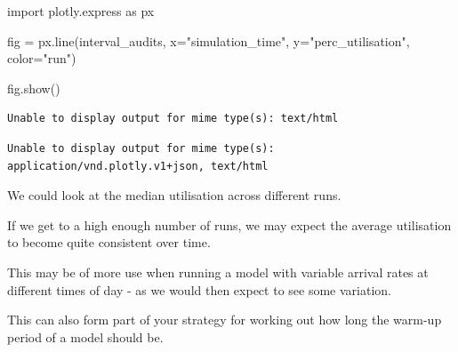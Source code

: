 \documentclass[
  letterpaper,
  DIV=11,
  numbers=noendperiod]{scrreprt}
\newenvironment{Shaded}{}{}
\newcommand{\ImportTok}[1]{\textcolor[rgb]{0.01,0.18,0.38}{#1}}
\newcommand{\NormalTok}[1]{\textcolor[rgb]{0.14,0.16,0.18}{#1}}
\newcommand{\OperatorTok}[1]{\textcolor[rgb]{0.14,0.16,0.18}{#1}}
\newcommand{\StringTok}[1]{\textcolor[rgb]{0.01,0.18,0.38}{#1}}
\begin{document}
\begin{Shaded}
\begin{Highlighting}[]
\ImportTok{import}\NormalTok{ plotly.express }\ImportTok{as}\NormalTok{ px}

\NormalTok{fig }\OperatorTok{=}\NormalTok{ px.line(interval\_audits, x}\OperatorTok{=}\StringTok{"simulation\_time"}\NormalTok{, y}\OperatorTok{=}\StringTok{"perc\_utilisation"}\NormalTok{, color}\OperatorTok{=}\StringTok{"run"}\NormalTok{)}

\NormalTok{fig.show()}
\end{Highlighting}
\end{Shaded}

\begin{verbatim}
Unable to display output for mime type(s): text/html
\end{verbatim}

\begin{verbatim}
Unable to display output for mime type(s): application/vnd.plotly.v1+json, text/html
\end{verbatim}

We could look at the median utilisation across different runs.

If we get to a high enough number of runs, we may expect the average
utilisation to become quite consistent over time.

\begin{tcolorbox}[enhanced jigsaw, colframe=quarto-callout-tip-color-frame, bottomtitle=1mm, breakable, rightrule=.15mm, coltitle=black, colbacktitle=quarto-callout-tip-color!10!white, opacityback=0, leftrule=.75mm, arc=.35mm, toptitle=1mm, title=\textcolor{quarto-callout-tip-color}{\faLightbulb}\hspace{0.5em}{Tip}, titlerule=0mm, colback=white, toprule=.15mm, bottomrule=.15mm, left=2mm, opacitybacktitle=0.6]

This may be of more use when running a model with variable arrival rates
at different times of day - as we would then expect to see some
variation.

\end{tcolorbox}

\begin{tcolorbox}[enhanced jigsaw, colframe=quarto-callout-tip-color-frame, bottomtitle=1mm, breakable, rightrule=.15mm, coltitle=black, colbacktitle=quarto-callout-tip-color!10!white, opacityback=0, leftrule=.75mm, arc=.35mm, toptitle=1mm, title=\textcolor{quarto-callout-tip-color}{\faLightbulb}\hspace{0.5em}{Tip}, titlerule=0mm, colback=white, toprule=.15mm, bottomrule=.15mm, left=2mm, opacitybacktitle=0.6]

This can also form part of your strategy for working out how long the
warm-up period of a model should be.

\end{tcolorbox}
\end{document}
